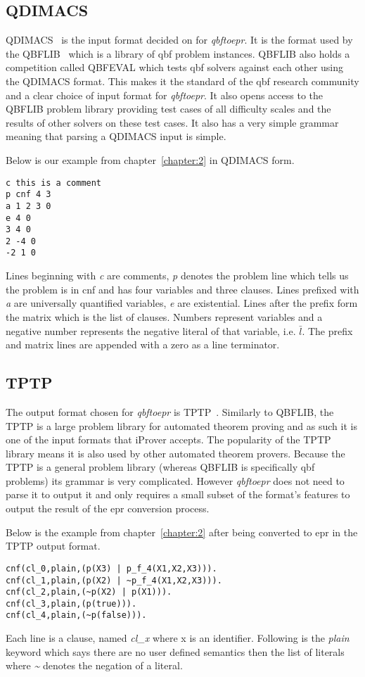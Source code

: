 \subsection{QDIMACS}
QDIMACS~\cite{qdimacs} is the input format decided on for \textit{qbftoepr}. It is the format used by the QBFLIB~\cite{qbflib} which is a library of \gls{qbf} problem instances. QBFLIB also holds a competition called QBFEVAL which tests \gls{qbf} solvers against each other using the QDIMACS format. This makes it the standard of the \gls{qbf} research community and a clear choice of input format for \textit{qbftoepr}. It also opens access to the QBFLIB problem library providing test cases of all difficulty scales and the results of other solvers on these test cases. It also has a very simple grammar meaning that parsing a QDIMACS input is simple.

Below is our example from chapter~\ref{chapter:2} in QDIMACS form.
\begin{lstlisting}
c this is a comment
p cnf 4 3
a 1 2 3 0
e 4 0
3 4 0
2 -4 0
-2 1 0
\end{lstlisting}
Lines beginning with \textit{c} are comments, \textit{p} denotes the problem line which tells us the problem is in \gls{cnf} and has four variables and three clauses. Lines prefixed with \textit{a} are universally quantified variables, \textit{e} are existential. Lines after the prefix form the matrix which is the list of clauses. Numbers represent variables and a negative number represents the negative literal of that variable, i.e. $\bar{l}$. The prefix and matrix lines are appended with a zero as a line terminator.

\subsection{TPTP}
The output format chosen for \textit{qbftoepr} is TPTP~\cite{tptp}. Similarly to QBFLIB, the TPTP is a large problem library for automated theorem proving and as such it is one of the input formats that iProver accepts. The popularity of the TPTP library means it is also used by other automated theorem provers. Because the TPTP is a general problem library (whereas QBFLIB is specifically \gls{qbf} problems) its grammar is very complicated. However \textit{qbftoepr} does not need to parse it to output it and only requires a small subset of the format's features to output the result of the \gls{epr} conversion process.

Below is the example from chapter~\ref{chapter:2} after being converted to \gls{epr} in the TPTP output format.
\begin{lstlisting}
cnf(cl_0,plain,(p(X3) | p_f_4(X1,X2,X3))).
cnf(cl_1,plain,(p(X2) | ~p_f_4(X1,X2,X3))).
cnf(cl_2,plain,(~p(X2) | p(X1))).
cnf(cl_3,plain,(p(true))).
cnf(cl_4,plain,(~p(false))).
\end{lstlisting}
Each line is a clause, named \textit{cl\_x} where x is an identifier. Following is the \textit{plain} keyword which says there are no user defined semantics then the list of literals where \textit{\textasciitilde} denotes the negation of a literal.

